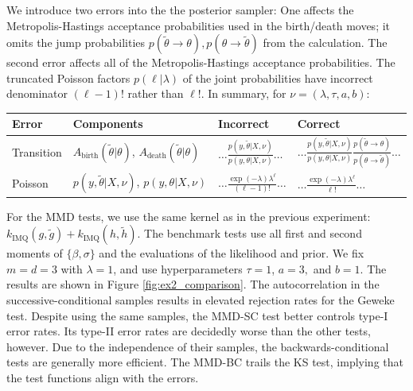\documentclass{article}
\begin{document}
We introduce two errors into the the posterior sampler: One affects the Metropolis-Hastings acceptance probabilities used in the birth/death moves; it omits the jump probabilities $p(\tilde{\theta} \rightarrow \theta), p(\theta \rightarrow \tilde{\theta})$ from the calculation. The second error affects all of the Metropolis-Hastings acceptance probabilities. The truncated Poisson factors $p(\ell|\lambda)$  of the joint probabilities have incorrect denominator $(\ell-1)!$ rather than $\ell!$. In summary, for $\nu=(\lambda, \tau, a, b )$:
\begin{center}
   \begin{tabular}{llll}
                  Error & Components & Incorrect & Correct \\
    \midrule  
         Transition & $A_{\text{birth}}(\tilde{\theta}|\theta)$, $A_{\text{death}}(\tilde{\theta}|\theta)$  &  $\ldots\frac{p(y, \tilde{\theta} | X, \nu )}{p(y, \theta | X, \nu )}\ldots$ & $\ldots\frac{p(y, \tilde{\theta} | X, \nu )}{p(y, \theta | X, \nu)} \frac{p(\tilde{\theta} \rightarrow \theta)}{p(\theta \rightarrow \tilde{\theta})}\ldots$\\
         Poisson & $p(y, \tilde{\theta} | X, \nu)$, $p(y, \theta | X, \nu )$ & $\ldots \frac{\exp{(-\lambda)} \lambda^{\ell}}{(\ell-1)!} \ldots$ & $\ldots \frac{\exp{(-\lambda)} \lambda^{\ell}}{\ell!} \ldots$ \\
\end{tabular}
\end{center}    


For the MMD tests, we use the same kernel as in the previous experiment: $k_{\mathrm{IMQ}}(g, \tilde{g}) + k_{\mathrm{IMQ}}(h, \tilde{h})$. The benchmark tests use all first and second moments of $\{\beta,\sigma\}$ and the evaluations of the likelihood and prior.
We fix $m=d=3$ with $\lambda=1$, and use hyperparameters $\tau=1$, $a=3,$ and $b=1$. 
The results are shown in Figure \ref{fig:ex2_comparison}. The autocorrelation in the successive-conditional samples results in elevated rejection rates for the Geweke test. Despite using the same samples, the MMD-SC test better controls type-I error rates. Its type-II error rates are decidedly worse than the other tests, however. Due to the independence of their samples, the backwards-conditional tests are generally more efficient. The MMD-BC trails the KS test, implying that the test functions align with the errors.
\end{document}
